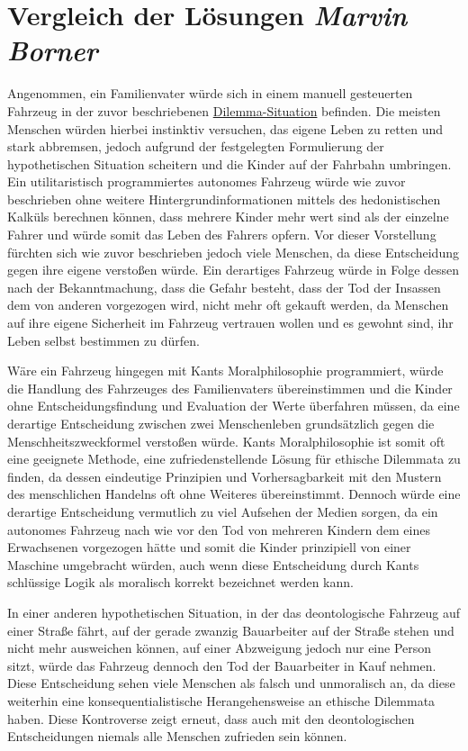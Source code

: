 \documentclass[a4paper, 12pt, openany]{book}
\newcommand\Section[2]{\section[#1 {\scriptsize\itshape#2}]{#1 \footnotesize\itshape#2}}
\begin{document}
        \Section{Vergleich der Lösungen}{Marvin Borner}
            Angenommen, ein Familienvater würde sich in einem manuell gesteuerten Fahrzeug in der zuvor beschriebenen \hyperref[dilemmata]{Dilemma-Situation} befinden. Die meisten Menschen würden hierbei instinktiv versuchen, das eigene Leben zu retten und stark abbremsen, jedoch aufgrund der festgelegten Formulierung der hypothetischen Situation scheitern und die Kinder auf der Fahrbahn umbringen. Ein utilitaristisch programmiertes autonomes Fahrzeug würde wie zuvor beschrieben ohne weitere Hintergrundinformationen mittels des hedonistischen Kalküls berechnen können, dass mehrere Kinder mehr wert sind als der einzelne Fahrer und würde somit das Leben des Fahrers opfern. Vor dieser Vorstellung fürchten sich wie zuvor beschrieben jedoch viele Menschen, da diese Entscheidung gegen ihre eigene verstoßen würde. Ein derartiges Fahrzeug würde in Folge dessen nach der Bekanntmachung, dass die Gefahr besteht, dass der Tod der Insassen dem von anderen vorgezogen wird, nicht mehr oft gekauft werden, da Menschen auf ihre eigene Sicherheit im Fahrzeug vertrauen wollen und es gewohnt sind, ihr Leben selbst bestimmen zu dürfen.\par
            Wäre ein Fahrzeug hingegen mit Kants Moralphilosophie programmiert, würde die Handlung des Fahrzeuges des Familienvaters übereinstimmen und die Kinder ohne Entscheidungsfindung und Evaluation der Werte überfahren müssen, da eine derartige Entscheidung zwischen zwei Menschenleben grundsätzlich gegen die Menschheitszweckformel verstoßen würde. Kants Moralphilosophie ist somit oft eine geeignete Methode, eine zufriedenstellende Lösung für ethische Dilemmata zu finden, da dessen eindeutige Prinzipien und Vorhersagbarkeit mit den Mustern des menschlichen Handelns oft ohne Weiteres übereinstimmt. Dennoch würde eine derartige Entscheidung vermutlich zu viel Aufsehen der Medien sorgen, da ein autonomes Fahrzeug nach wie vor den Tod von mehreren Kindern dem eines Erwachsenen vorgezogen hätte und somit die Kinder prinzipiell von einer Maschine umgebracht würden, auch wenn diese Entscheidung durch Kants schlüssige Logik als moralisch korrekt bezeichnet werden kann.\par
            In einer anderen hypothetischen Situation, in der das deontologische Fahrzeug auf einer Straße fährt, auf der gerade zwanzig Bauarbeiter auf der Straße stehen und nicht mehr ausweichen können, auf einer Abzweigung jedoch nur eine Person sitzt, würde das Fahrzeug dennoch den Tod der Bauarbeiter in Kauf nehmen. Diese Entscheidung sehen viele Menschen als falsch und unmoralisch an, da diese weiterhin eine konsequentialistische Herangehensweise an ethische Dilemmata haben. Diese Kontroverse zeigt erneut, dass auch mit den deontologischen Entscheidungen niemals alle Menschen zufrieden sein können.
        
\end{document}
